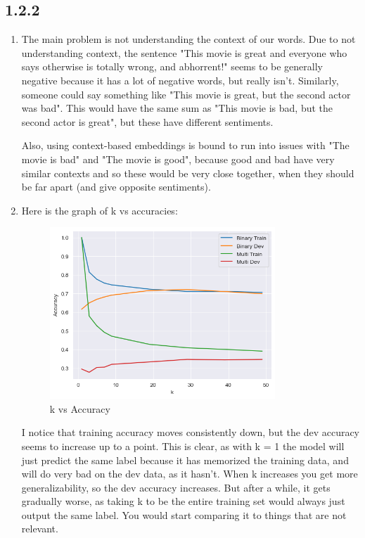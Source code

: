 \documentclass[12pt]{article}
\theoremstyle{definitionstyle}
\begin{document}
    \subsection*{1.2.2}
    \begin{enumerate}
        \item The main problem is not understanding the context of our words. Due to not understanding context, the sentence "This movie is great and everyone who says otherwise is totally wrong, and abhorrent!" seems to be generally negative because it has a lot of negative words, but really isn't. Similarly, someone could say something like "This movie is great, but the second actor was bad". This would have the same sum as "This movie is bad, but the second actor is great", but these have different sentiments. 

        Also, using context-based embeddings is bound to run into issues with "The movie is bad" and "The movie is good", because good and bad have very similar contexts and so these would be very close together, when they should be far apart (and give opposite sentiments).
        \item Here is the graph of k vs accuracies:
        \begin{figure}[H]
            \centering
            \includegraphics[width=0.8\textwidth]{images/effect_of_k_on_knn.png}
            \caption{k vs Accuracy}
        \end{figure}
        I notice that training accuracy moves consistently down, but the dev accuracy seems to increase up to a point. This is clear, as with k = 1 the model will just predict the same label because it has memorized the training data, and will do very bad on the dev data, as it hasn't. When k increases you get more generalizability, so the dev accuracy increases. But after a while, it gets gradually worse, as taking k to be the entire training set would always just output the same label. You would start comparing it to things that are not relevant. 
    \end{enumerate}
\end{document}
